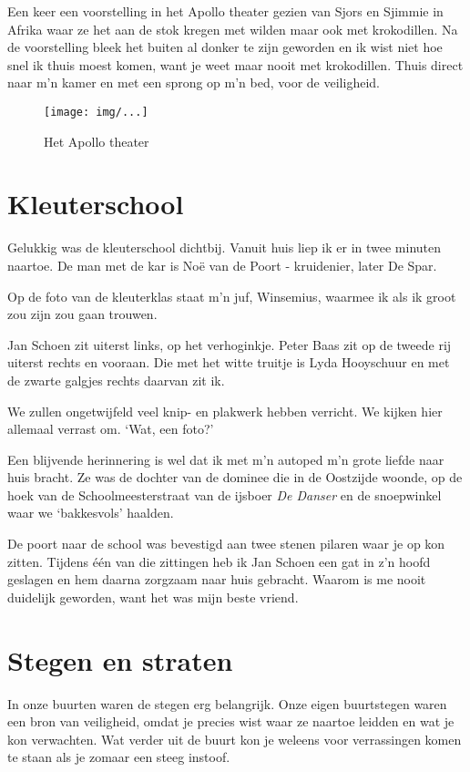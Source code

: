 \documentclass[10pt,twoside,openright]{memoir}
\begin{document}
Een keer een voorstelling in het Apollo theater gezien van Sjors en Sjimmie in Afrika waar ze het aan de stok kregen met wilden maar ook met krokodillen. Na de voorstelling bleek het buiten al donker te zijn geworden en ik wist niet hoe snel ik thuis moest komen, want je weet maar nooit met krokodillen. Thuis direct naar m’n kamer en met een sprong op m’n bed, voor de veiligheid. 

\begin{figure}[t]
\texttt{[image: img/...]}
\caption{Het Apollo theater}
\end{figure}

\chapter{Kleuterschool} %
\label{cha:kleuterschool}

Gelukkig was de kleuterschool dichtbij. Vanuit huis liep ik er in twee minuten naartoe. De man met de kar is Noë van de Poort - kruidenier, later De Spar.

Op de foto van de kleuterklas staat m’n juf, Winsemius, waarmee ik als ik groot zou zijn zou gaan trouwen. 

Jan Schoen zit uiterst links, op het verhoginkje. Peter Baas zit op de tweede rij uiterst rechts en vooraan. Die met het witte truitje is Lyda Hooyschuur en met de zwarte galgjes rechts daarvan zit ik. 

We zullen ongetwijfeld veel knip- en plakwerk hebben verricht. We kijken hier allemaal verrast om. ‘Wat, een foto?’

Een blijvende herinnering is wel dat ik met m’n autoped m’n grote liefde naar huis bracht. Ze was de dochter van de dominee die in de Oostzijde woonde, op de hoek van de Schoolmeesterstraat van de ijsboer \emph{De Danser} en de snoepwinkel waar we ‘bakkesvols’ haalden. 

De poort naar de school was bevestigd aan twee stenen pilaren waar je op kon zitten. Tijdens één van die zittingen heb ik Jan Schoen een gat in z’n hoofd geslagen en hem daarna zorgzaam naar huis gebracht. Waarom is me nooit duidelijk geworden, want het was mijn beste vriend. 

\chapter{Stegen en straten} %
\label{cha:stegen_straten}

In onze buurten waren de stegen erg belangrijk. Onze eigen buurtstegen waren een bron van veiligheid, omdat je precies wist waar ze naartoe leidden en wat je kon verwachten. Wat verder uit de buurt kon je weleens voor verrassingen komen te staan als je zomaar een steeg instoof. 
\end{document}
